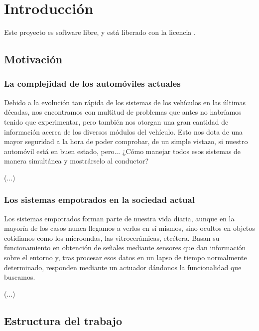 \chapter{Introducción}

Este proyecto es software libre, y está liberado con la licencia \cite{gplv3}.

\section{Motivación}

\subsection{La complejidad de los automóviles actuales}

Debido a la evolución tan rápida de los sistemas de los vehículos en las últimas décadas, nos encontramos con multitud de problemas que antes no habríamos tenido que experimentar, pero también nos otorgan una gran cantidad de información acerca de los diversos módulos del vehículo. 
Esto nos dota de una mayor seguridad a la hora de poder comprobar, de un simple vistazo, si nuestro automóvil está en buen estado, pero... ¿Cómo manejar todos esos sistemas de manera simultánea y mostrárselo al conductor? 

(...)

\subsection{Los sistemas empotrados en la sociedad actual}

Los sistemas empotrados forman parte de nuestra vida diaria, aunque en la mayoría de los casos nunca llegamos a verlos en sí mismos, sino ocultos en objetos cotidianos como los microondas, las vitrocerámicas, etcétera. Basan su funcionamiento en obtención de señales mediante sensores que dan información sobre el entorno y, tras procesar esos datos en un lapso de tiempo normalmente determinado, responden mediante un actuador dándonos la funcionalidad que buscamos. 

(...)

\newpage
\section{Estructura del trabajo}
